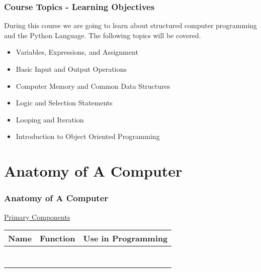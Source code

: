 \documentclass[fleqn]{beamer} %
\newcommand{\sectiontitleII}{Course Topics - Learning Objectives}
\newcommand{\sectiontitleIII}{Anatomy of A Computer}
\begin{document}
	\begin{frame}[label=sectionII,containsverbatim] \small
		\frametitle{\sectiontitleII}
 		During this course we are going to learn about structured computer programming and the Python Language. The following topics will be covered.
		\begin{itemize}
			
			\item Variables, Expressions, and Assignment
			
			\item Basic Input and Output Operations
			
			\item Computer Memory and Common Data Structures
			
			\item Logic and Selection Statements 
			
			\item Looping and Iteration 
			
			\item Introduction to Object Oriented Programming  
			
		\end{itemize}


	\end{frame}

\section{\sectiontitleIII}

	\begin{frame} \small
		\frametitle{\sectiontitleIII}
		
		\underline{Primary Components}\vspace{2.5mm}\\
		\renewcommand{\arraystretch}{1.5}
		\begin{tabular}{|c|c|c|}\hline
			Name\hspace*{15mm}& Function\hspace*{20mm}& Use in Programming \hspace*{15mm}\\ \hline
			&& \\ \hline 
			&& \\ \hline
			&& \\ \hline\hline
			&& \\ \hline
			&& \\ \hline
			&& \\ \hline
			&& \\ \hline
		\end{tabular}
	\end{frame}
\end{document}
